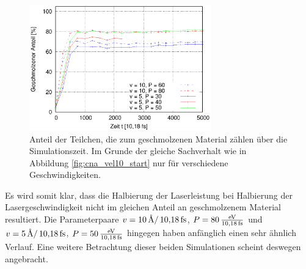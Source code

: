 		\begin{figure}[!ht]
			\centering
			\includegraphics[width=0.7\textwidth]{chapter/main/single/plt/power_calibration/cna_vel5_start.eps}
			\caption{Anteil der Teilchen, die zum geschmolzenen Material zählen über die
			Simulationszeit. Im Grunde der gleiche Sachverhalt wie in Abbildung
			\ref{fig:cna_vel10_start} nur für verschiedene Geschwindigkeiten.}
			\label{fig:cna_vel5}
		\end{figure}

		Es wird somit klar, dass die Halbierung der Laserleistung bei Halbierung der
		Lasergeschwindigkeit nicht im gleichen Anteil an geschmolzenem Material resultiert. Die
		Parameterpaare $v = \SI{10}{\angstrom\per\timeunit}$, $P = \powerunit[80]$ und
		$v = \SI{5}{\angstrom\per\timeunit}$, $P = \powerunit[50]$ hingegen haben anfänglich einen
		sehr ähnlich Verlauf. Eine weitere Betrachtung dieser beiden Simulationen scheint deswegen
		angebracht.


